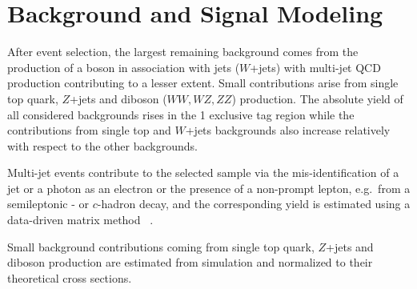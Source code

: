 \section{Background and Signal Modeling}
\label{sec:backgroundAndSignalModelling}
After event selection, the largest remaining background comes from the production of a \w boson in association with
jets ($W$+jets) with multi-jet QCD production contributing to a lesser extent. Small contributions arise from single top quark, $Z$+jets and diboson ($WW,WZ,ZZ$) production. The absolute yield of all considered backgrounds rises in the 1 exclusive \bt tag region while the contributions from single top and $W$+jets backgrounds also increase relatively with respect to the other backgrounds.

Multi-jet events contribute to the selected sample via the mis-identification of a jet or a photon as an electron or the presence of a non-prompt lepton, e.g.~from a semileptonic \bt- or $c$-hadron decay, and the corresponding yield is estimated using a data-driven matrix method ~\cite{ttbar_3pb}.



Small background contributions coming from single top quark, $Z$+jets and diboson production are estimated from simulation and normalized to their theoretical cross sections.

